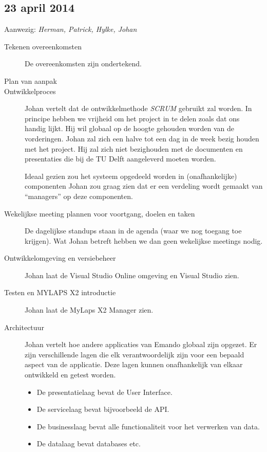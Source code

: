 \subsection*{23 april 2014}
\label{sec:meeting-23-apr}

Aanwezig: \textit{Herman, Patrick, Hylke, Johan}

\begin{description}
\item[Tekenen overeenkomsten] De overeenkomsten zijn ondertekend.

\item[Plan van aanpak] 

\item[Ontwikkelproces] Johan vertelt dat de ontwikkelmethode \textit{SCRUM} gebruikt zal worden. In principe hebben we vrijheid om het project in te delen zoals dat ons handig lijkt. Hij wil globaal op de hoogte gehouden worden van de vorderingen. Johan zal zich een halve tot een dag in de week bezig houden met het project. Hij zal zich niet bezighouden met de documenten en presentaties die bij de TU Delft aangeleverd moeten worden.

Ideaal gezien zou het systeem opgedeeld worden in (onafhankelijke) componenten Johan zou graag zien dat er een verdeling wordt gemaakt van ``managers'' op deze componenten.

\item[Wekelijkse meeting plannen voor voortgang, doelen en taken] De dagelijkse standups staan in de agenda (waar we nog toegang toe krijgen). Wat Johan betreft hebben we dan geen wekelijkse meetings nodig.

\item[Ontwikkelomgeving en versiebeheer] Johan laat de Visual Studio Online omgeving en Visual Studio zien.

\item[Testen en MYLAPS X2 introductie] Johan laat de MyLaps X2 Manager zien.

\item[Architectuur] Johan vertelt hoe andere applicaties van Emando globaal zijn opgezet. Er zijn verschillende lagen die elk verantwoordelijk zijn voor een bepaald aspect van de applicatie. Deze lagen kunnen onafhankelijk van elkaar ontwikkeld en getest worden.

\begin{itemize}
  \item De presentatielaag bevat de User Interface.
  \item De servicelaag bevat bijvoorbeeld de API.
  \item De businesslaag bevat alle functionaliteit voor het verwerken van data.
  \item De datalaag bevat databases etc.
\end{itemize}

\end{description}